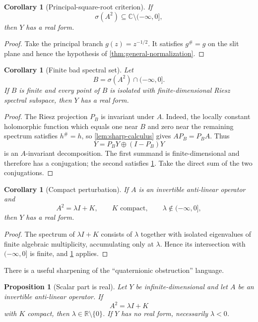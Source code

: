 \documentclass[11pt]{article}
\newtheorem{proposition}[theorem]{Proposition}
\newtheorem{corollary}[theorem]{Corollary}
\theoremstyle{definition}
\theoremstyle{remark}
\newcommand{\C}{\mathbb C}
\newcommand{\R}{\mathbb R}
\newcommand{\spec}{\sigma}
\begin{document}
\begin{corollary}[Principal-square-root criterion]\label{cor:principal-root}
If
\[
       \spec(A^2)\subseteq\C\setminus(-\infty,0],
\]
then $Y$ has a real form.
\end{corollary}

\begin{proof}
Take the principal branch $g(z)=z^{-1/2}$. It satisfies $g^{\#}=g$ on the slit plane and hence the hypothesis of \cref{thm:general-normalization}.
\end{proof}

\begin{corollary}[Finite bad spectral set]\label{cor:finite-bad}
Let
\[
 B=\spec(A^2)\cap(-\infty,0].
\]
If $B$ is finite and every point of $B$ is isolated with finite-dimensional Riesz spectral subspace, then $Y$ has a real form.
\end{corollary}

\begin{proof}
The Riesz projection $P_B$ is invariant under $A$. Indeed, the locally constant holomorphic function which equals one near $B$ and zero near the remaining spectrum satisfies $h^{\#}=h$, so \cref{lem:sharp-calculus} gives $AP_B=P_BA$. Thus
\[
 Y=P_BY\oplus(I-P_B)Y
\]
is an $A$-invariant decomposition. The first summand is finite-dimensional and therefore has a conjugation; the second satisfies \cref{cor:principal-root}. Take the direct sum of the two conjugations.
\end{proof}

\begin{corollary}[Compact perturbation]\label{cor:compact-square}
If $A$ is an invertible anti-linear operator and
\[
       A^2=\lambda I+K,
       \qquad K\text{ compact},\qquad
       \lambda\notin(-\infty,0],
\]
then $Y$ has a real form.
\end{corollary}

\begin{proof}
The spectrum of $\lambda I+K$ consists of $\lambda$ together with isolated eigenvalues of finite algebraic multiplicity, accumulating only at $\lambda$. Hence its intersection with $(-\infty,0]$ is finite, and \cref{cor:finite-bad} applies.
\end{proof}

There is a useful sharpening of the ``quaternionic obstruction'' language.

\begin{proposition}[Scalar part is real]\label{prop:scalar-real}
Let $Y$ be infinite-dimensional and let $A$ be an invertible anti-linear operator. If
\[
 A^2=\lambda I+K
\]
with $K$ compact, then $\lambda\in\R\setminus\{0\}$. If $Y$ has no real form, necessarily $\lambda<0$.
\end{proposition}
\end{document}
